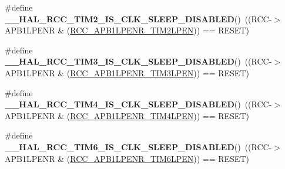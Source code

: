 \begin{DoxyCompactItemize}
\item 
\hypertarget{group___r_c_c___a_p_b1___clock___sleep___enable___disable___status_ga0a89c97a19d5057d710e475ff24b71ec}{\#define {\bfseries \-\_\-\-\_\-\-H\-A\-L\-\_\-\-R\-C\-C\-\_\-\-T\-I\-M2\-\_\-\-I\-S\-\_\-\-C\-L\-K\-\_\-\-S\-L\-E\-E\-P\-\_\-\-D\-I\-S\-A\-B\-L\-E\-D}()~((R\-C\-C-\/$>$A\-P\-B1\-L\-P\-E\-N\-R \& (\hyperlink{group___peripheral___registers___bits___definition_ga1f561f8bfc556b52335ec2a32ba81c44}{R\-C\-C\-\_\-\-A\-P\-B1\-L\-P\-E\-N\-R\-\_\-\-T\-I\-M2\-L\-P\-E\-N})) == R\-E\-S\-E\-T)}\label{group___r_c_c___a_p_b1___clock___sleep___enable___disable___status_ga0a89c97a19d5057d710e475ff24b71ec}

\item 
\hypertarget{group___r_c_c___a_p_b1___clock___sleep___enable___disable___status_gade73c47dc34e5841b826a0e641220801}{\#define {\bfseries \-\_\-\-\_\-\-H\-A\-L\-\_\-\-R\-C\-C\-\_\-\-T\-I\-M3\-\_\-\-I\-S\-\_\-\-C\-L\-K\-\_\-\-S\-L\-E\-E\-P\-\_\-\-D\-I\-S\-A\-B\-L\-E\-D}()~((R\-C\-C-\/$>$A\-P\-B1\-L\-P\-E\-N\-R \& (\hyperlink{group___peripheral___registers___bits___definition_ga9391d99885a0a6fbaf3447117ac0f7aa}{R\-C\-C\-\_\-\-A\-P\-B1\-L\-P\-E\-N\-R\-\_\-\-T\-I\-M3\-L\-P\-E\-N})) == R\-E\-S\-E\-T)}\label{group___r_c_c___a_p_b1___clock___sleep___enable___disable___status_gade73c47dc34e5841b826a0e641220801}

\item 
\hypertarget{group___r_c_c___a_p_b1___clock___sleep___enable___disable___status_gaa138ce5c7fcfcfd42726b03e7de02c41}{\#define {\bfseries \-\_\-\-\_\-\-H\-A\-L\-\_\-\-R\-C\-C\-\_\-\-T\-I\-M4\-\_\-\-I\-S\-\_\-\-C\-L\-K\-\_\-\-S\-L\-E\-E\-P\-\_\-\-D\-I\-S\-A\-B\-L\-E\-D}()~((R\-C\-C-\/$>$A\-P\-B1\-L\-P\-E\-N\-R \& (\hyperlink{group___peripheral___registers___bits___definition_ga6f04aff278b72fbf6acbe0ad947b06ae}{R\-C\-C\-\_\-\-A\-P\-B1\-L\-P\-E\-N\-R\-\_\-\-T\-I\-M4\-L\-P\-E\-N})) == R\-E\-S\-E\-T)}\label{group___r_c_c___a_p_b1___clock___sleep___enable___disable___status_gaa138ce5c7fcfcfd42726b03e7de02c41}

\item 
\hypertarget{group___r_c_c___a_p_b1___clock___sleep___enable___disable___status_gaafa07cf3cfeac5be4071e52201dfcc7d}{\#define {\bfseries \-\_\-\-\_\-\-H\-A\-L\-\_\-\-R\-C\-C\-\_\-\-T\-I\-M6\-\_\-\-I\-S\-\_\-\-C\-L\-K\-\_\-\-S\-L\-E\-E\-P\-\_\-\-D\-I\-S\-A\-B\-L\-E\-D}()~((R\-C\-C-\/$>$A\-P\-B1\-L\-P\-E\-N\-R \& (\hyperlink{group___peripheral___registers___bits___definition_ga439a5998fd60c3375411c7db2129ac89}{R\-C\-C\-\_\-\-A\-P\-B1\-L\-P\-E\-N\-R\-\_\-\-T\-I\-M6\-L\-P\-E\-N})) == R\-E\-S\-E\-T)}\label{group___r_c_c___a_p_b1___clock___sleep___enable___disable___status_gaafa07cf3cfeac5be4071e52201dfcc7d}


\end{DoxyCompactItemize}
